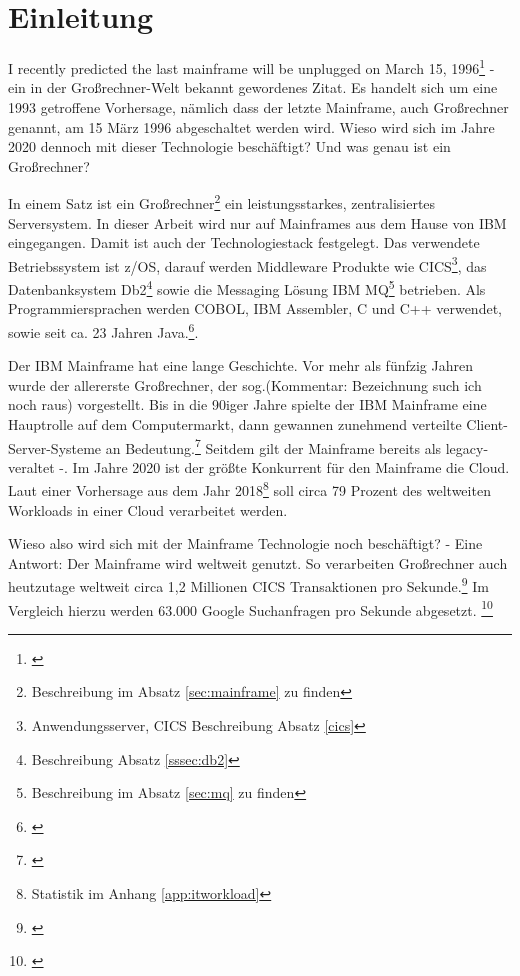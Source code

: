 \chapter{Einleitung}\label{ch:einleitung}
\glqq I recently predicted the last mainframe will be unplugged on March 15, 1996\grqq\footnote{\cite{Alsop.1993}} - ein in der Großrechner-Welt bekannt gewordenes Zitat.
Es handelt sich um eine 1993 getroffene Vorhersage, nämlich dass der letzte Mainframe, auch Großrechner genannt, am 15 März 1996 abgeschaltet werden wird.
Wieso wird sich im Jahre 2020 dennoch mit dieser Technologie beschäftigt? 
Und was genau ist ein Großrechner?

In einem Satz ist ein Großrechner\footnote{Beschreibung im Absatz \ref{sec:mainframe} zu finden} ein leistungsstarkes, zentralisiertes Serversystem.
In dieser Arbeit wird nur auf Mainframes aus dem Hause von IBM eingegangen.
Damit ist auch der Technologiestack festgelegt.
Das verwendete Betriebssystem ist z/OS, darauf werden Middleware Produkte wie CICS\footnote{Anwendungsserver, CICS Beschreibung Absatz \ref{cics}}, das Datenbanksystem Db2\footnote{ Beschreibung Absatz \ref{sssec:db2}} sowie die Messaging Lösung \glqq IBM MQ\grqq{}\footnote{Beschreibung im Absatz \ref{sec:mq} zu finden} betrieben.
Als Programmiersprachen werden COBOL, IBM Assembler, C und C++ verwendet, sowie seit ca. 23 Jahren Java.\footnote{\cite{Steegmans.2003}}.

Der IBM Mainframe hat eine lange Geschichte.
Vor mehr als fünfzig Jahren wurde der allererste Großrechner, der sog.(Kommentar: Bezeichnung such ich noch raus) vorgestellt.
Bis in die 90iger Jahre spielte der IBM Mainframe eine Hauptrolle auf dem Computermarkt, dann gewannen zunehmend verteilte Client-Server-Systeme an Bedeutung.\footnote{\cite{Ceruzzi.2003}}
Seitdem gilt der Mainframe bereits als \glqq  legacy\grqq{}- veraltet -.
Im Jahre 2020 ist der größte Konkurrent für den Mainframe die Cloud.
Laut einer Vorhersage aus dem Jahr 2018\footnote{Statistik im Anhang \ref{app:itworkload}} soll circa 79 Prozent des weltweiten Workloads in einer Cloud verarbeitet werden.

Wieso also wird sich mit der Mainframe Technologie noch beschäftigt? - Eine Antwort: Der Mainframe wird weltweit genutzt.
So verarbeiten Großrechner auch heutzutage weltweit circa 1,2 Millionen CICS Transaktionen pro Sekunde.\footnote{\cite{IBM.2019}}
Im Vergleich hierzu werden 63.000 Google Suchanfragen pro Sekunde abgesetzt. \footnote{\cite{Sullivan.2016}}

